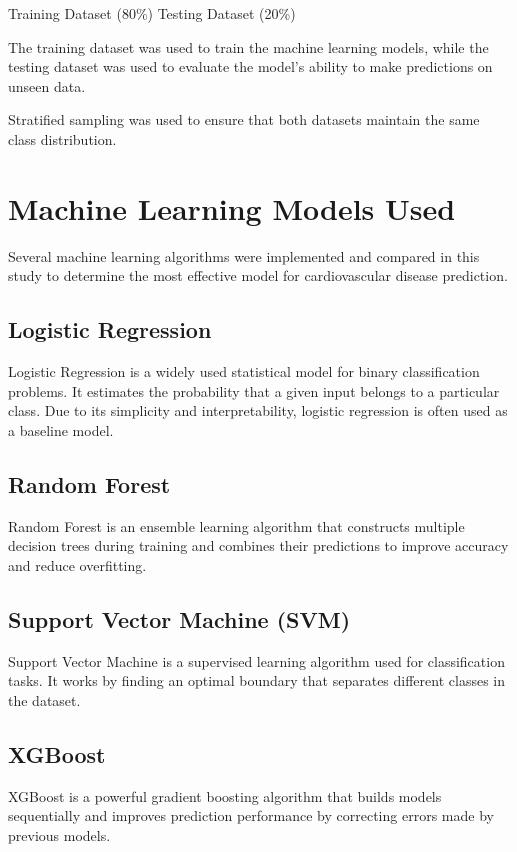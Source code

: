 Training Dataset (80\%)
Testing Dataset (20\%)

The training dataset was used to train the machine learning models, while the testing dataset was used to evaluate the model's ability to make predictions on unseen data.

Stratified sampling was used to ensure that both datasets maintain the same class distribution.

\section{Machine Learning Models Used}

Several machine learning algorithms were implemented and compared in this study to determine the most effective model for cardiovascular disease prediction.

\subsection{Logistic Regression}

Logistic Regression is a widely used statistical model for binary classification problems. It estimates the probability that a given input belongs to a particular class. Due to its simplicity and interpretability, logistic regression is often used as a baseline model.

\subsection{Random Forest}

Random Forest is an ensemble learning algorithm that constructs multiple decision trees during training and combines their predictions to improve accuracy and reduce overfitting.

\subsection{Support Vector Machine (SVM)}

Support Vector Machine is a supervised learning algorithm used for classification tasks. It works by finding an optimal boundary that separates different classes in the dataset.

\subsection{XGBoost}

XGBoost is a powerful gradient boosting algorithm that builds models sequentially and improves prediction performance by correcting errors made by previous models.

